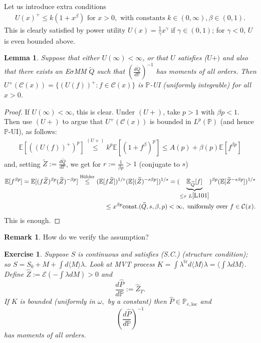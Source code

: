 \documentclass[12pt,a4paper, twoside]{article}
\newtheorem{lem}{Lemma}[section]
\newtheorem{exe}{Exercise}[section]
\theoremstyle{definition}
\newtheorem{rem}{Remark}[section]
\newcommand{\EE}{\mathbb{E}} %
\newcommand{\PP}{\mathbb{P}} %
\begin{document}
\\\\
Let us introduce extra conditions 
\begin{align*}
U(x)^+ \leq k(1 + x^\beta) \text{ for } x>0, \text{ with constants } k \in (0, \infty), \beta \in (0,1). \tag{$U+$}
\end{align*}
This is clearly satisfied by power utility $U(x)= \frac{1}{\gamma}x^\gamma$ if $\gamma \in (0, 1)$; for $\gamma<0$, $U$ is even bounded above. 
\begin{lem} \label{L132} Suppose that either $U( \infty) < \infty$, or that $U$ satisfies ($U+)$ and also that there exists an E$\sigma$MM $\widetilde{Q}$ such that $( \frac{d \widetilde{Q}}{d \PP})^{-1}$ has moments of all orders. Then $U^+( \mathcal{C}(x)) = \{ (U(f))^+ : f \in \mathcal{C}(x)\}$ is $\PP$-UI (uniformly integrable) for all $x>0$. 
\end{lem}
\begin{proof}
If $U( \infty) < \infty$, this is clear. Under $(U+)$,  take $p>1$ with $\beta p <1$. Then use $(U+)$ to argue that $U^+( \mathcal{C}(x))$ is bounded in $L^p(\PP)$ (and hence $\PP$-UI), as follows: 
\begin{align*}
\EE[((U(f))^+)^p] \overset{(U+)}\leq k^p \EE[(1+f^\beta)^p] \leq A(p) + \beta (p) \EE[f^{\beta p}]
\end{align*}
and, setting $\widetilde{Z}:= \frac{d \widetilde{Q}}{d \PP}$, we get for $r:= \frac{1}{\beta p}>1$ (conjugate to $s$)
\begin{align*}
\EE[f^{\beta p}] = \EE[(f \widetilde{Z})^{ \beta p} ( \widetilde{Z})^{- \beta p}] \overset{\text{Hölder}}\leq ( \EE[f \widetilde{Z}])^{1/r} ( \EE[ ( \widetilde{Z})^{-s \beta p}])^{1/s} = ( \underbrace{\EE_{\widetilde{Q}} [f]}_{ \leq x \ L \ref{L101}})^{\beta p} ( \EE[ \widetilde{Z}^{- s \beta p}])^{1/s} \\
\leq x^{\beta p} \text{const.}(\widetilde{Q}, s,\beta ,  p) < \infty, \text{ uniformly over } f  \in \mathcal{C}(x).
\end{align*}
This is enough.
\end{proof}
\begin{rem} How do we verify the assumption?
\begin{exe} \label{ex22} Suppose $S$ is continuous and satisfies (S.C.) (structure condition); so $S= S_0 + M + \int d \langle M \rangle \lambda$. Look at MVT process $K= \int \lambda^\text{tr} d \langle M \rangle \lambda = \langle \int \lambda d M \rangle$. Define $\hat{Z}:= \mathcal{E}( - \int \lambda dM ) >0$ and $$\frac{d \hat{P}}{d \PP}:= \hat{Z}_T.$$ If $K$ is bounded (uniformly in $\omega,$ by a constant) then $\hat{P} \in \PP_{e,  \text{loc}}$ and $$\left( \frac{d \hat{P}}{d \PP}\right)^{-1}$$ has moments of all orders. 
\end{exe}
\end{rem}
\end{document}
